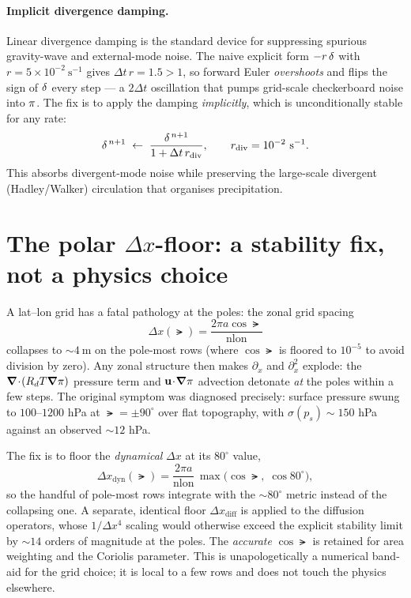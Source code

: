\paragraph{Implicit divergence damping.}
Linear divergence damping is the standard device for suppressing spurious
gravity-wave and external-mode noise. The naive explicit form
$-r\,\delta$ with $r=5\times10^{-2}\ \mathrm{s^{-1}}$ gives
$\Delta t\,r = 1.5 > 1$, so forward Euler \emph{overshoots} and flips the sign of
$\delta$ every step --- a $2\Delta t$ oscillation that pumps grid-scale checkerboard
noise into $\pi$. The fix is to apply the damping \emph{implicitly}, which is
unconditionally stable for any rate:
\begin{equation}
  \delta^{\,n+1} \;\leftarrow\; \frac{\delta^{\,n+1}}{1 + \Delta t\,r_{\mathrm{div}}},
  \qquad r_{\mathrm{div}} = 10^{-2}\ \mathrm{s^{-1}}.
\end{equation}
This absorbs divergent-mode noise while preserving the large-scale divergent
(Hadley/Walker) circulation that organises precipitation.

\section{The polar \texorpdfstring{$\Delta x$}{dx}-floor: a stability fix, not a physics choice}
\label{sec:polardx}

A lat--lon grid has a fatal pathology at the poles: the zonal grid spacing
\begin{equation}
  \Delta x(\lat) = \frac{2\pi a\cos\lat}{\mathrm{nlon}}
\end{equation}
collapses to $\sim 4\ \mathrm{m}$ on the pole-most rows (where $\cos\lat$ is floored
to $10^{-5}$ to avoid division by zero). Any zonal structure then makes
$\partial_x$ and $\partial_x^2$ explode: the $\boldsymbol{\nabla}\!\cdot\!(R_d T\boldsymbol{\nabla}\pi)$ pressure
term and $\mathbf{u}\!\cdot\!\boldsymbol{\nabla}\pi$ advection detonate \emph{at} the poles within a
few steps. The original symptom was diagnosed precisely: surface pressure swung to
$100$--$1200$ hPa at $\lat=\pm 90^\circ$ over flat topography, with
$\sigma(p_s)\sim 150$ hPa against an observed $\sim 12$ hPa.

The fix is to floor the \emph{dynamical} $\Delta x$ at its $80^\circ$ value,
\begin{equation}
  \Delta x_{\mathrm{dyn}}(\lat) = \frac{2\pi a}{\mathrm{nlon}}\,
     \max\!\big(\cos\lat,\;\cos 80^\circ\big),
  \label{eq:dxfloor}
\end{equation}
so the handful of pole-most rows integrate with the $\sim 80^\circ$ metric instead
of the collapsing one. A separate, identical floor $\Delta x_{\mathrm{diff}}$ is
applied to the diffusion operators, whose $1/\Delta x^4$ scaling would otherwise
exceed the explicit stability limit by $\sim 14$ orders of magnitude at the poles.
The \emph{accurate} $\cos\lat$ is retained for area weighting and the Coriolis
parameter. This is unapologetically a numerical band-aid for the grid choice; it is
local to a few rows and does not touch the physics elsewhere.

